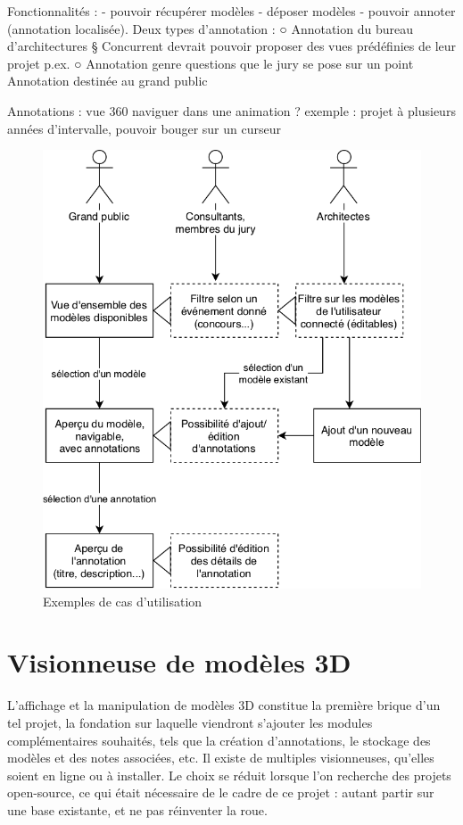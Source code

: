 Fonctionnalités :
	- pouvoir récupérer modèles
	- déposer modèles
	- pouvoir annoter (annotation localisée). Deux types d'annotation :
		○ Annotation du bureau d'architectures
			§ Concurrent devrait pouvoir proposer des vues prédéfinies de leur projet p.ex.
		○ Annotation genre questions que le jury se pose sur un point
Annotation  destinée au grand public

Annotations : vue 360
naviguer dans une animation ? exemple : projet à plusieurs années d’intervalle, pouvoir bouger sur un curseur

\begin{figure}[h]
    \centering
    \includegraphics[width=\linewidth]{Figures/use-cases.png}
    \caption{Exemples de cas d'utilisation}
    \label{fig:use-cases}
\end{figure}

\section{Visionneuse de modèles 3D}

L'affichage et la manipulation de modèles 3D constitue la première brique d'un tel projet, la fondation sur laquelle viendront s'ajouter les modules complémentaires souhaités, tels que la création d'annotations, le stockage des modèles et des notes associées, etc.
Il existe de multiples visionneuses, qu'elles soient en ligne ou à installer. Le choix se réduit lorsque l'on recherche des projets open-source, ce qui était nécessaire de le cadre de ce projet : autant partir sur une base existante, et ne pas réinventer la roue.

